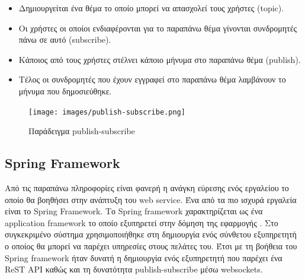 \begin{itemize}
\item Δημιουργείται ένα θέμα το οποίο μπορεί να απασχολεί τους χρήστες (topic).
\item Οι χρήστες οι οποίοι ενδιαφέρονται για το παραπάνω θέμα γίνονται συνδρομητές πάνω σε αυτό (subscribe).
\item Κάποιος από τους χρήστες στέλνει κάποιο μήνυμα στο παραπάνω θέμα (publish).
\item Τέλος οι συνδρομητές που έχουν εγγραφεί στο παραπάνω θέμα λαμβάνουν το μήνυμα που δημοσιεύθηκε.
\end{itemize}


\begin{figure}[h]
  \centering
  \texttt{[image: images/publish-subscribe.png]}
  \caption{Παράδειγμα publish-subscribe}
  \label{fig:publish-subscribe}
\end{figure}

\subsection{Spring Framework}
Από τις παραπάνω πληροφορίες είναι φανερή η ανάγκη εύρεσης ενός εργαλείου το οποίο θα βοηθήσει στην ανάπτυξη του web service. Ένα από τα πιο ισχυρά εργαλεία είναι το Spring Framework. Το Spring framework χαρακτηρίζεται ως ένα application framework το οποίο εξυπηρετεί στην δόμηση της εφαρμογής \citep{springframework}. Στο συγκεκριμένο σύστημα χρησιμοποιήθηκε στη δημιουργία ενός σύνθετου εξυπηρετητή ο οποίος θα μπορεί να παρέχει υπηρεσίες στους πελάτες του. Έτσι με τη βοήθεια του Spring framework ήταν δυνατή η δημιουργία ενός εξυπηρετητή που παρέχει ένα ReST API καθώς και τη δυνατότητα publish-subscribe μέσω websockets.
